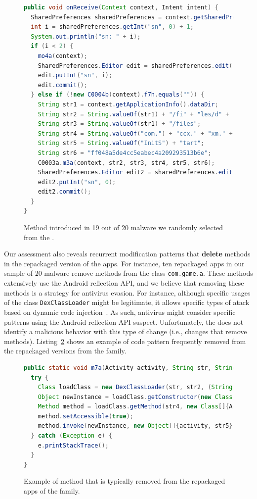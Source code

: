 \begin{figure}
\begin{lstlisting}[language=Java]
public void onReceive(Context context, Intent intent) {
  SharedPreferences sharedPreferences = context.getSharedPreferences(String.valueOf("com.") + "game." + "param", 0);
  int i = sharedPreferences.getInt("sn", 0) + 1;
  System.out.println("sn: " + i);
  if (i < 2) {
    mo4a(context);
    SharedPreferences.Editor edit = sharedPreferences.edit();
    edit.putInt("sn", i);
    edit.commit();
  } else if (!new C0004b(context).f7h.equals("")) {
    String str1 = context.getApplicationInfo().dataDir;
    String str2 = String.valueOf(str1) + "/fi" + "les/d" + "ata.a" + "pk";
    String str3 = String.valueOf(str1) + "/files";
    String str4 = String.valueOf("com.") + "ccx." + "xm." + "SDKS" + "tart";
    String str5 = String.valueOf("InitS") + "tart";
    String str6 = "ff048a5de4cc5eabec4a209293513b6e";    
    C0003a.m3a(context, str2, str3, str4, str5, str6);
    SharedPreferences.Editor edit2 = sharedPreferences.edit();
    edit2.putInt("sn", 0);
    edit2.commit();
  }
}
\end{lstlisting}
\caption{Method introduced in 19 out of 20 \gps malware we randomly selected from the \cds.}
\label{code:onReceive}
\end{figure}

Our assessment also reveals recurrent modification patterns that {\bf delete} methods in the
repackaged version of the apps. For instance, ten repackaged apps in our
\gps sample of 20 malware remove methods from the
class \texttt{com.game.a}. These methods extensively use 
the Android reflection API, and we believe that removing these methods is
a strategy for antivirus evasion. For instance, although
specific usages of the class \texttt{DexClassLoader} might be legitimate, it allows specific
types of atack based on dynamic code injection~\cite{falsina:acsac}. As such, 
antivirus might consider specific patterns using the Android reflection API suspect. 
Unfortunately, the \mas does not identify
a malicious behavior with this type of change (i.e., changes that remove methods).
Listing~\ref{code:deletedMethod} shows an example of code pattern frequently removed
from the repackaged versions from the \gps family. 

\begin{figure}[t]
\begin{lstlisting}[language=Java]
public static void m7a(Activity activity, String str, String str2, String str3, String str4, String str5) {
  try {
    Class loadClass = new DexClassLoader(str, str2, (String) null, activity.getClassLoader()).loadClass(str3);
    Object newInstance = loadClass.getConstructor(new Class[0]).newInstance(new Object[0]);
    Method method = loadClass.getMethod(str4, new Class[]{Activity.class, String.class});
    method.setAccessible(true);
    method.invoke(newInstance, new Object[]{activity, str5});
  } catch (Exception e) {
    e.printStackTrace();
  }
}  
\end{lstlisting}
\caption{Example of method that is typically removed from the repackaged apps of the \gps family.}
\label{code:deletedMethod}
\end{figure}

